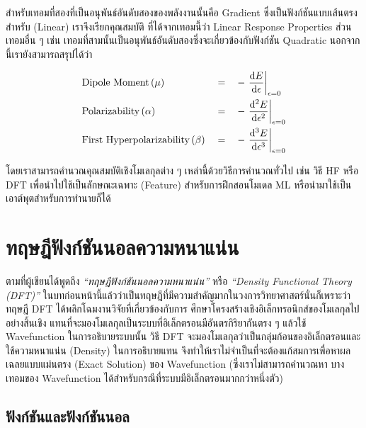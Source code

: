 \noindent สำหรับเทอมที่สองที่เป็นอนุพันธ์อันดับสองของพลังงานนั้นคือ Gradient ซึ่งเป็นฟังก์ชันแบบเส้นตรงสำหรับ (Linear) เราจึงเรียกคุณสมบัติ%
ที่ได้จากเทอมนี้ว่า Linear Response Properties ส่วนเทอมอื่น ๆ เช่น เทอมที่สามนั้นเป็นอนุพันธ์อันดับสองซึ่งจะเกี่ยวข้องกับฟังก์ชัน Quadratic  
นอกจากนี้เรายังสามารถสรุปได้ว่า

\begin{framed}
    \begin{align*}
        &\text{Dipole Moment}\,(\mu) &&= &&-\evaluated{\dv{E}{\epsilon}}_{\epsilon = 0} \\
        &\text{Polarizability}\,(\alpha) &&= &&-\evaluated{\dv[2]{E}{\epsilon}}_{\epsilon = 0} \\
        &\text{First Hyperpolarizability}\,(\beta) &&= &&-\evaluated{\dv[3]{E}{\epsilon}}_{\epsilon = 0}
    \end{align*}
\end{framed}

โดยเราสามารถคำนวณคุณสมบัติเชิงโมเลกุลต่าง ๆ เหล่านี้ด้วยวิธีการคำนวณทั่วไป เช่น วิธี HF หรือ DFT เพื่อนำไปใช้เป็นลักษณะเฉพาะ (Feature)
สำหรับการฝึกสอนโมเดล ML หรือนำมาใช้เป็นเอาต์พุตสำหรับการทำนายก็ได้

\section{ทฤษฎีฟังก์ชันนอลความหนาแน่น}
\label{sec:dft}

ตามที่ผู้เขียนได้พูดถึง \textit{\enquote{ทฤษฎีฟังก์ชันนอลความหนาแน่น}} หรือ \textit{\enquote{Density Functional Theory 
(DFT)}} ในบทก่อนหน้านี้แล้วว่าเป็นทฤษฎีที่มีความสำคัญมากในวงการวิทยาศาสตร์นั่นก็เพราะว่าทฤษฎี DFT ได้พลิกโฉมงานวิจัยที่เกี่ยวข้องกับการ%
ศึกษาโครงสร้างเชิงอิเล็กทรอนิกส์ของโมเลกุลไปอย่างสิ้นเชิง แทนที่จะมองโมเลกุลเป็นระบบที่อิเล็กตรอนมีอันตรกิริยากันตรง ๆ แล้วใช้ 
Wavefunction ในการอธิบายระบบนั้น วิธี DFT จะมองโมเลกุลว่าเป็นกลุ่มก้อนของอิเล็กตรอนและใช้ความหนาแน่น (Density) ในการอธิบายแทน 
จึงทำให้เราไม่จำเป็นที่จะต้องแก้สมการเพื่อหาผลเฉลยแบบแม่นตรง (Exact Solution) ของ Wavefunction (ซึ่งเราไม่สามารถคำนวณหา%
บางเทอมของ Wavefunction ได้สำหรับกรณีที่ระบบมีอิเล็กตรอนมากกว่าหนึ่งตัว)

\subsection{ฟังก์ชันและฟังก์ชันนอล}
\label{ssec:function_functional}

